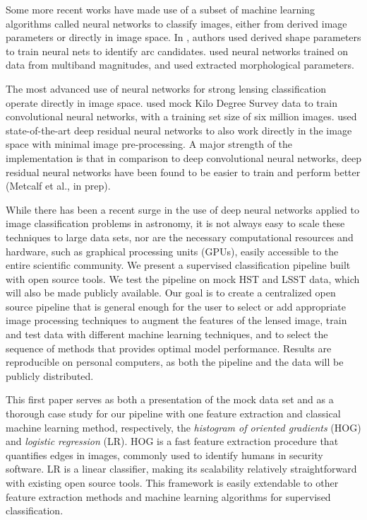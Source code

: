 \documentclass{emulateapj}
\begin{document}
Some more recent works have made use of a subset of machine
learning algorithms called neural networks to classify images,
either from derived image
parameters or directly in image space.  In \citet{estrada_etal07},
authors used derived shape parameters to train neural nets to identify
arc candidates.  \citet{agnello_etal15} used neural networks trained
on data from multiband magnitudes, and \citet{bom_etal16} used
extracted morphological parameters.

The most advanced use of neural networks for strong lensing
classification operate directly in image space.
\citep{petrillo_etal17} used mock Kilo Degree Survey data to train
convolutional neural networks, with a training set size of six million
images. \citet{lanusse_etal17} used state-of-the-art deep residual
neural networks to also work directly in the image space with minimal
image pre-processing.  A major strength of the \citet{lanusse_etal17}
implementation is that in comparison to deep convolutional neural
networks, deep residual neural networks have been found to be easier
to train and perform better (Metcalf et al., in prep).

While there has been a recent surge in the use of deep neural networks
applied to image classification problems in astronomy, it is not
always easy to scale these techniques to large data sets, nor are the
necessary computational resources and hardware, such as graphical
processing units (GPUs), easily accessible to the entire scientific
community.  We present a supervised classification pipeline built with
open source tools.  We test the pipeline on mock HST and LSST data,
which will also be made publicly available.  Our goal is to create a
centralized open source pipeline that is general enough for the user
to select or add appropriate image processing techniques to augment
the features of the lensed image, train and test data with different
machine learning techniques, and to select the sequence of methods
that provides optimal model performance.  Results are reproducible on
personal computers, as both the pipeline and the data will be publicly
distributed.

This first paper serves as both a presentation of the mock data set
and as a thorough case study for our pipeline with one feature
extraction and classical machine learning method, respectively, the
{\em histogram of oriented gradients} (HOG) and {\em logistic
  regression} (LR).  HOG is a fast feature extraction procedure that
quantifies edges in images, commonly used to identify humans in
security software.  LR is a linear classifier, making its scalability
relatively straightforward with existing open source tools.  This
framework is easily extendable to other feature extraction methods
and machine learning algorithms for supervised classification.
\end{document}
